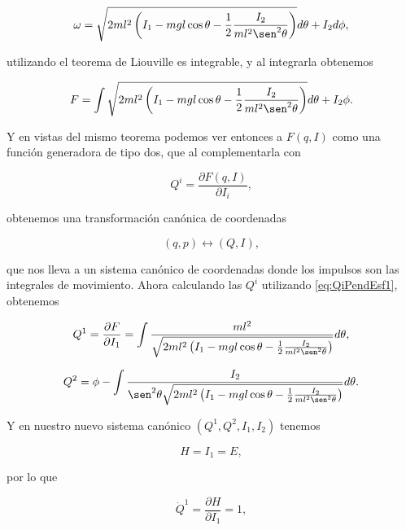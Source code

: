 \documentclass[a4paper,10pt]{article}
\numberwithin{equation}{section}
\begin{document}
\begin{equation}
 \omega = \sqrt{2ml^2\left(I_1 - mgl\cos{\theta} - \frac{1}{2}\frac{I_2}{ml^2\sen^2{\theta}}
 \right)}d\theta + I_2d\phi,
\end{equation}

utilizando el teorema de Liouville es integrable, y al integrarla obtenemos 

\begin{equation}
 F = \int \sqrt{2ml^2\left(I_1 - mgl\cos{\theta} - \frac{1}{2}\frac{I_2}{ml^2\sen^2{\theta}}
 \right)}d\theta + I_2\phi.
\end{equation}

Y en vistas del mismo teorema podemos ver entonces a $F(q,I)$ como una función 
generadora de tipo dos, que al complementarla con 

\begin{equation}
 Q^i = \frac{\partial F(q,I)}{\partial I_i},
 \label{eq:QiPendEsf1}
\end{equation}

obtenemos una transformación canónica de coordenadas 

\begin{equation}
 (q,p) \leftrightarrow (Q,I),
\end{equation}

que nos lleva a un sistema canónico de coordenadas donde los impulsos son las 
integrales de movimiento. Ahora calculando las $Q^i$ utilizando \eqref{eq:QiPendEsf1}, 
obtenemos 

\begin{equation}
 Q^1 = \frac{\partial F}{\partial I_1} = \int \frac{ml^2}{\sqrt{2ml^2\left(I_1 -
 mgl\cos{\theta} - \frac{1}{2}\frac{I_2}{ml^2\sen^2{\theta}} \right)}}d\theta,
 \label{eq:Q1PendEsf1}
\end{equation}

\begin{equation}
 Q^2 = \phi - \int \frac{I_2}{\sen^2{\theta}\sqrt{2ml^2\left(I_1 - mgl\cos{\theta} - 
 \frac{1}{2}\frac{I_2}{ml^2\sen^2{\theta}} \right)}}d\theta.
 \label{eq:Q2PendEsf2}
\end{equation}

Y en nuestro nuevo sistema canónico $(Q^1,Q^2,I_1,I_2)$ tenemos 

\begin{equation}
 H = I_1 = E,
\end{equation}

por lo que 

\begin{equation}
 \dot{Q}^1 = \frac{\partial H}{\partial I_1} = 1,
\end{equation}
\end{document}
